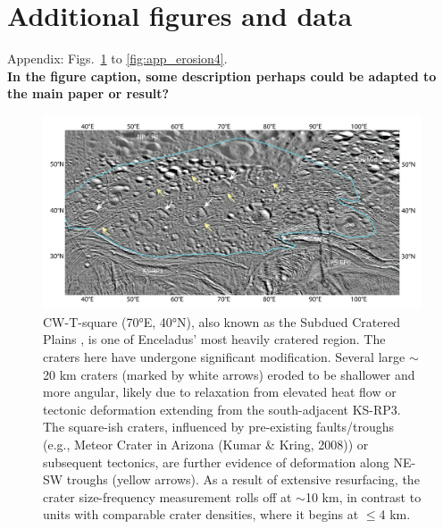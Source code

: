 \documentclass[preprint,11pt,3p,times,authoryear]{elsarticle}
\begin{document}
{\section{Additional figures and data}
\setcounter{figure}{0}
Appendix: Figs.~\ref{fig:app_erosion1} to \ref{fig:app_erosion4}.\\
\textbf{In the figure caption, some description perhaps could be adapted to the main paper or result? }


\begin{figure}[H]
    \includegraphics[width=1.0\linewidth]{fig/FigS4B_CW-T-square.png}
    \caption{CW-T-square (70°E, 40°N), also known as the Subdued Cratered Plains \citep{CrowWillard2015}, is one of Enceladus' most heavily cratered region. The craters here have undergone significant modification. Several large $\sim$20 km craters (marked by white arrows) eroded to be shallower and more angular, likely due to relaxation from elevated heat flow \citep{Bland2012} or tectonic deformation extending from the south-adjacent KS-RP3. The square-ish craters, influenced by pre-existing faults/troughs (e.g., Meteor Crater in Arizona (Kumar \& Kring, 2008)) or subsequent tectonics, are further evidence of deformation along NE-SW troughs (yellow arrows). As a result of extensive resurfacing, the crater size-frequency measurement rolls off at $\sim$10 km, in contrast to units with comparable crater densities, where it begins at $\le$4 km.}
    \label{fig:app_erosion1}
\end{figure}


}
\end{document}
